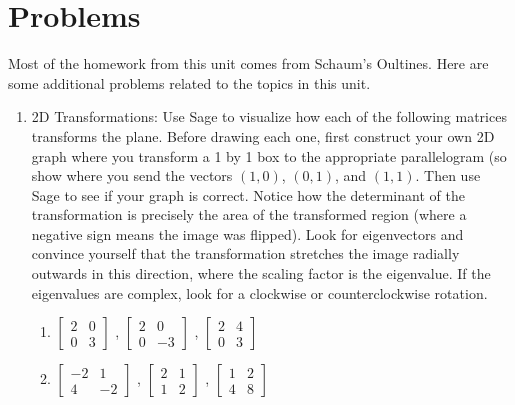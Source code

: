 

\section{Problems}

Most of the homework from this unit comes from Schaum's Oultines. Here are some additional problems related to the topics in this unit.

\begin{enumerate}
	\item 2D Transformations:
	Use Sage to visualize how each of the following matrices transforms the plane. Before drawing each one, first construct your own 2D graph where you transform a 1 by 1 box to the appropriate parallelogram (so show where you send the vectors $(1,0)$, $(0,1)$, and $(1,1)$. Then use Sage to see if your graph is correct.
Notice how the determinant of the transformation is precisely the area of the transformed region (where a negative sign means the image was flipped). Look for eigenvectors and convince yourself that the transformation stretches the image radially outwards in this direction, where the scaling factor is the eigenvalue. If the eigenvalues are complex, look for a clockwise or counterclockwise rotation.
\begin{enumerate}
\item
	$\begin{bmatrix}
	2 &0 \\
	0 &3
	\end{bmatrix}$
,	$\begin{bmatrix}
	2 &0 \\
	0 &-3
	\end{bmatrix}$
,	$\begin{bmatrix}
	2 &4 \\
	0 &3
	\end{bmatrix}$
\item 
	$\begin{bmatrix}
	-2 &1 \\
	4 &-2
	\end{bmatrix}$
,	$\begin{bmatrix}
	2 &1 \\
	1 &2
	\end{bmatrix}$
,	$\begin{bmatrix}
	1 &2 \\
	4 &8
	\end{bmatrix}$


\end{enumerate}
\end{enumerate}
